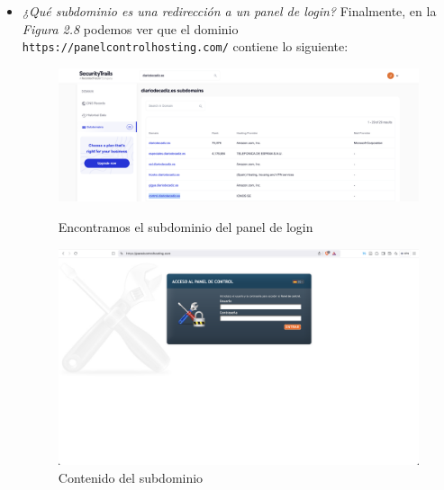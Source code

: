 \documentclass[12pt]{book}
\begin{document}
\begin{itemize}
    \item \textit{¿Qué subdominio es una redirección a un panel de login?}
    \newline
    Finalmente, en la \textit{Figura 2.8} podemos ver que el dominio\\ \texttt{https://panelcontrolhosting.com/} contiene lo siguiente:
    \begin{figure}[h]
        \centering
        \includegraphics[width=.9\linewidth]{Practica 3y4/images/Screenshot 2024-10-31 at 09.56.50.png}
        \caption{Encontramos el subdominio del panel de login}
        \label{fig:enter-label}        
        \vspace{1cm}
        \centering
        \includegraphics[width=.9\linewidth]{Practica 3y4/images/Screenshot 2024-10-31 at 09.57.02.png}
        \caption{Contenido del subdominio}
        \label{fig:enter-label}
    \end{figure}
\end{itemize}
\newpage
\end{document}
